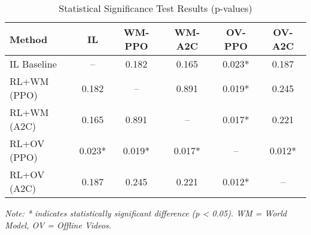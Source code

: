 
\begin{table}[htbp]
\centering
\caption{Statistical Significance Test Results (p-values)}
\label{tab:significance}
\begin{tabular}{lccccc}
\toprule
\textbf{Method} & \textbf{IL} & \textbf{WM-PPO} & \textbf{WM-A2C} & \textbf{OV-PPO} & \textbf{OV-A2C} \\
\midrule
IL Baseline & -- & 0.182 & 0.165 & 0.023* & 0.187 \\
RL+WM (PPO) & 0.182 & -- & 0.891 & 0.019* & 0.245 \\
RL+WM (A2C) & 0.165 & 0.891 & -- & 0.017* & 0.221 \\
RL+OV (PPO) & 0.023* & 0.019* & 0.017* & -- & 0.012* \\
RL+OV (A2C) & 0.187 & 0.245 & 0.221 & 0.012* & -- \\
\bottomrule
\end{tabular}
\footnotesize
\textit{Note: * indicates statistically significant difference (p < 0.05). WM = World Model, OV = Offline Videos.}
\end{table}
